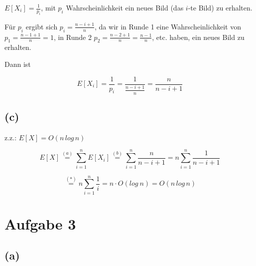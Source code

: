 \documentclass[11pt,a4paper,ngerman]{article}
\begin{document}
$E[X_{i}]=\frac{1}{p_{i}}$, mit $p_{i}$ Wahrscheinlichkeit ein neues
Bild (das $i$-te Bild) zu erhalten.

Für $p_{i}$ ergibt sich $p_{i}=\frac{n-i+1}{n}$, da wir in Runde
1 eine Wahrscheinlichkeit von $p_{1}=\frac{n-1+1}{n}=1$, in Runde
2 $p_{2}=\frac{n-2+1}{n}=\frac{n-1}{n}$, etc. haben, ein neues Bild
zu erhalten.

Dann ist

\[
E[X_{i}]=\frac{1}{p_{i}}=\frac{1}{\frac{n-i+1}{n}}=\frac{n}{n-i+1}
\]




\subsection*{(c)}


z.z.: $E[X]=O(n\, log\, n)$

\[
E[X]\stackrel{(a)}{=}\sum_{i=1}^{n}E[X_{i}]\stackrel{(b)}{=}\sum_{i=1}^{n}\frac{n}{n-i+1}=n\sum_{i=1}^{n}\frac{1}{n-i+1}
\]


\[
\stackrel{(*)}{=}n\sum_{i=1}^{n}\frac{1}{i}=n\cdot O(log\: n)=O(n\, log\, n)
\]




\section*{Aufgabe 3}




\subsection*{(a)}
\end{document}
